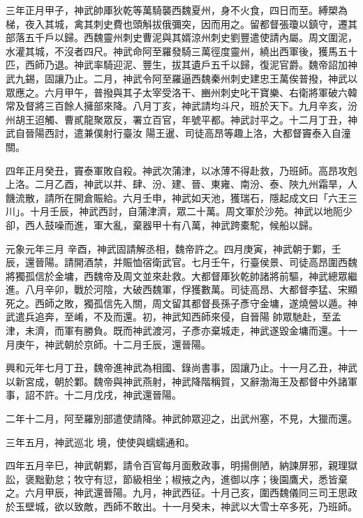\begin{pinyinscope}
 三年正月甲子，神武帥厙狄乾等萬騎襲西魏夏州，身不火食，四日而至。縛槊為梯，夜入其城，禽其刺史費也頭斛拔俄彌突，因而用之。留都督張瓊以鎮守，遷其部落五千戶以歸。西魏靈州刺史曹泥與其婿涼州刺史劉豐遣使請內屬。周文圍泥，水灌其城，不沒者四尺。神武命阿至羅發騎三萬徑度靈州，繞出西軍後，獲馬五十
 匹，西師乃退。神武率騎迎泥、豐生，拔其遺戶五千以歸，復泥官爵。魏帝詔加神武九錫，固讓乃止。二月，神武令阿至羅逼西魏秦州刺史建忠王萬俟普撥，神武以眾應之。六月甲午，普撥與其子太宰受洛干、豳州刺史叱干寶樂、右衛將軍破六韓常及督將三百餘人擁部來降。八月丁亥，神武請均斗尺，班於天下。九月辛亥，汾州胡王迢觸、曹貳龍聚眾反，署立百官，年號平都。神武討平之。十二月丁丑，神武自晉陽西討，遣兼僕射行臺汝
 陽王暹、司徒高昂等趣上洛，大都督竇泰入自潼關。



 四年正月癸丑，竇泰軍敗自殺。神武次蒲津，以冰薄不得赴救，乃班師。高昂攻剋上洛。二月乙酉，神武以并、肆、汾、建、晉、東雍、南汾、泰、陜九州霜旱，人饑流散，請所在開倉賑給。六月壬申，神武如天池，獲瑞石，隱起成文曰「六王三川」。十月壬辰，神武西討，自蒲津濟，眾二十萬。周文軍於沙苑。神武以地阨少卻，西人鼓噪而進，軍大亂，棄器甲十有八萬，神武跨橐駝，候船以歸。



 元象元年三月
 辛酉，神武固請解丞相，魏帝許之。四月庚寅，神武朝于鄴，壬辰，還晉陽。請開酒禁，并賑恤宿衛武官。七月壬午，行臺侯景、司徒高昂圍西魏將獨孤信於金墉，西魏帝及周文並來赴救。大都督厙狄乾帥諸將前驅，神武總眾繼進。八月辛卯，戰於河陰，大破西魏軍，俘獲數萬。司徒高昂、大都督李猛、宋顯死之。西師之敗，獨孤信先入關，周文留其都督長孫子彥守金墉，遂燒營以遁。神武遣兵追奔，至崤，不及而還。初，神武知西師來侵，自晉陽
 帥眾馳赴，至孟津，未濟，而軍有勝負。既而神武渡河，子彥亦棄城走，神武遂毀金墉而還。十一月庚午，神武朝於京師。十二月壬辰，還晉陽。



 興和元年七月丁丑，魏帝進神武為相國、錄尚書事，固讓乃止。十一月乙丑，神武以新宮成，朝於鄴。魏帝與神武燕射，神武降階稱賀，又辭渤海王及都督中外諸軍事，詔不許。十二月戊戌，神武還晉陽。



 二年十二月，阿至羅別部遣使請降。神武帥眾迎之，出武州塞，不見，大獵而還。



 三年五月，神武巡北
 境，使使與蠕蠕通和。



 四年五月辛巳，神武朝鄴，請令百官每月面敷政事，明揚側陋，納諫屏邪，親理獄訟，褒黜勤怠；牧守有愆，節級相坐；椒掖之內，進御以序；後園鷹犬，悉皆棄之。六月甲辰，神武還晉陽。九月，神武西征。十月己亥，圍西魏儀同三司王思政於玉壁城，欲以致敵，西師不敢出。十一月癸未，神武以大雪士卒多死，乃班師。




\end{pinyinscope}
